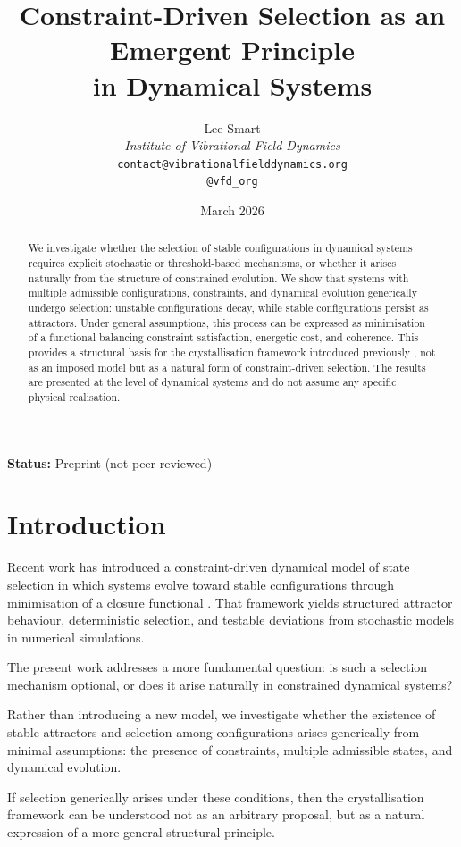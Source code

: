 \documentclass[12pt]{article}
\title{Constraint-Driven Selection as an Emergent Principle\\in Dynamical Systems}
\author{%
  Lee Smart\\[4pt]
  \textit{Institute of Vibrational Field Dynamics}\\[2pt]
  \texttt{contact@vibrationalfielddynamics.org}\\[2pt]
  \texttt{@vfd\_org}%
}
\date{March 2026}
\begin{document}
\maketitle

\noindent\textbf{Status:} Preprint (not peer-reviewed)

\begin{abstract}
We investigate whether the selection of stable configurations in dynamical systems requires explicit stochastic or threshold-based mechanisms, or whether it arises naturally from the structure of constrained evolution. We show that systems with multiple admissible configurations, constraints, and dynamical evolution generically undergo selection: unstable configurations decay, while stable configurations persist as attractors. Under general assumptions, this process can be expressed as minimisation of a functional balancing constraint satisfaction, energetic cost, and coherence. This provides a structural basis for the crystallisation framework introduced previously \citep{Smart2026}, not as an imposed model but as a natural form of constraint-driven selection. The results are presented at the level of dynamical systems and do not assume any specific physical realisation.
\end{abstract}

\section{Introduction}

Recent work has introduced a constraint-driven dynamical model of state selection in which systems evolve toward stable configurations through minimisation of a closure functional \citep{Smart2026}. That framework yields structured attractor behaviour, deterministic selection, and testable deviations from stochastic models in numerical simulations.

The present work addresses a more fundamental question: is such a selection mechanism optional, or does it arise naturally in constrained dynamical systems?

Rather than introducing a new model, we investigate whether the existence of stable attractors and selection among configurations arises generically from minimal assumptions: the presence of constraints, multiple admissible states, and dynamical evolution.

If selection generically arises under these conditions, then the crystallisation framework can be understood not as an arbitrary proposal, but as a natural expression of a more general structural principle.
\end{document}
